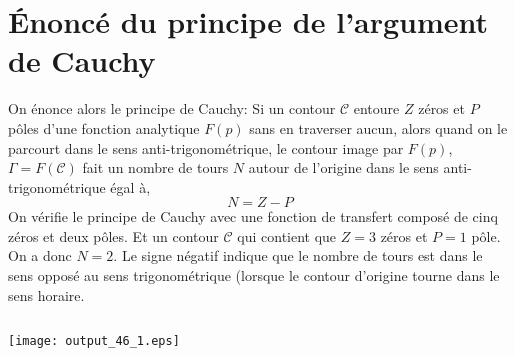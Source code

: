 \section{Énoncé du principe de l'argument de Cauchy}
On énonce alors le principe de Cauchy:
Si un contour \(\mathcal{C}\) entoure \(Z\) zéros et \(P\) pôles d'une
fonction analytique \(F(p)\) sans en traverser aucun, alors quand on le
parcourt dans le sens anti-trigonométrique, le contour image par
\(F(p)\), \(\Gamma=F(\mathcal{C})\) fait un nombre de tours \(N\) autour
de l'origine dans le sens anti-trigonométrique égal à,
\[
    N=Z-P
\]
On vérifie le principe de Cauchy avec une fonction de transfert composé
de cinq zéros et deux pôles. Et un contour \(\mathcal{C}\) qui contient 
que \(Z=3\) zéros et \(P=1\) pôle. On a donc \(N=2\). Le signe négatif
indique que le nombre de tours est dans le sens opposé au sens
trigonométrique (lorsque le contour d'origine tourne dans le sens
horaire.
\begin{tcolorbox}[breakable, size=fbox, boxrule=1pt, 
    pad at break*=1mm,colback=cellbackground, colframe=cellborder]
\inputminted{python}{codes/python/annexe_cauchy_cellule17.py}
\end{tcolorbox}
\begin{center}
    \texttt{[image: output\_46\_1.eps]}
\end{center}
